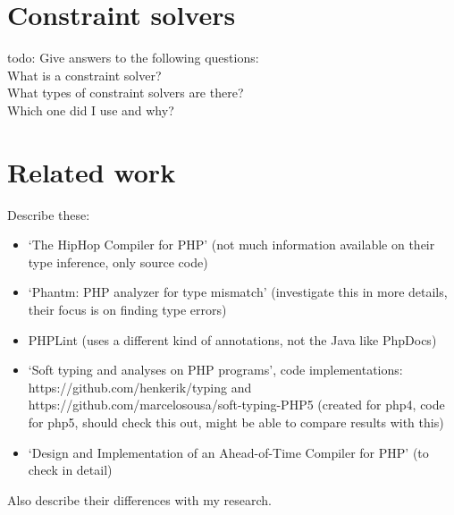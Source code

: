\documentclass[../main.tex]{subfiles}
\begin{document}
    \section{Constraint solvers}\label{sec:background_constraint-solver}
    todo: Give answers to the following questions:
    \\
    What is a constraint solver?
    \\
    What types of constraint solvers are there?
    \\
    Which one did I use and why?

    \section{Related work}\label{sec:background_related-work}
    Describe these:
    \begin{itemize}
        \item `The HipHop Compiler for PHP'\cite{Zhao:12} (not much information available on their type inference, only source code)
        \item `Phantm: PHP analyzer for type mismatch'\cite{Kne:10,Bar:10} (investigate this in more details, their focus is on finding type errors)
        \item PHPLint \footnotemark (uses a different kind of annotations, not the Java like PhpDocs)
        \item `Soft typing and analyses on PHP programs'\cite{}, code implementations: https://github.com/henkerik/typing and https://github.com/marcelosousa/soft-typing-PHP5 (created for php4, code for php5, should check this out, might be able to compare results with this)
        \item `Design and Implementation of an Ahead-of-Time Compiler for PHP'\cite{Big:10} (to check in detail)
    \end{itemize}
    Also describe their differences with my research.
\end{document}
